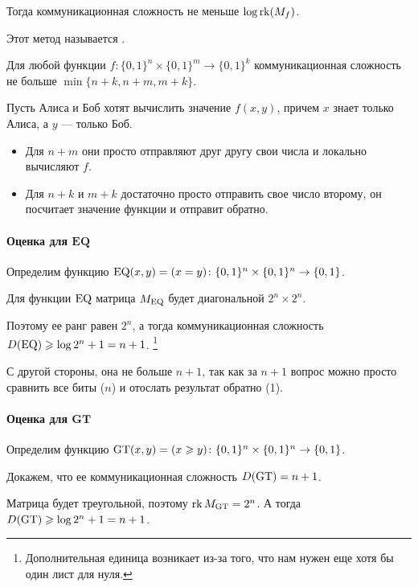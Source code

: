 Тогда коммуникационная сложность не меньше $ \log \operatorname{rk} (M_f)$.

Этот метод называется .

\begin{lm}\label{lm:minsum}
    Для любой функции $ f\colon \{0, 1\}^{n} \times  \{0, 1\}^{m} \to \{0, 1\}^{k}$ коммуникационная сложность не больше $ \min \{n+k, n+m, m+k\}$.
\end{lm}
\begin{proof*}
	Пусть Алиса и Боб хотят вычислить значение $ f(x, y)$, причем  $ x$ знает только Алиса, а $ y$ --- только Боб.
	\begin{itemize}
		\item Для $ n+m$ они просто отправляют друг другу свои числа и локально вычисляют $ f$.
		\item Для $ n+k$ и  $ m+k$ достаточно просто отправить свое число второму, он посчитает значение функции и отправит обратно.
	\end{itemize}

\end{proof*}

\paragraph{Оценка для $ \mathbf{EQ}$}
Определим функцию $ \operatorname{EQ}(x, y) = (x = y) \colon \{0, 1\}^{n} \times \{0, 1\}^{n} \to \{0, 1\}$.

Для функции $\operatorname{EQ}$ матрица $ M_{\operatorname{EQ}}$ будет диагональной $ 2^{n}\times 2^{n}$.

Поэтому ее ранг равен $ 2^{n}$, а тогда коммуникационная сложность
$ D(\operatorname{EQ}) \geqslant \log 2^{n} + 1= n +1$.
\footnote{Дополнительная единица возникает из-за того, что нам нужен еще хотя бы один лист для нуля.}

С другой стороны, она не больше $ n+1$, так как за  $ n+1$ вопрос можно просто сравнить все биты ($ n$) и отослать результат обратно (1).

\paragraph{Оценка для $\mathbf{GT}$}
Определим функцию $ \operatorname{GT}(x, y) = (x \geqslant y)\colon \{0, 1\}^{n} \times \{0, 1\}^{n} \to  \{0, 1\}$.

Докажем, что ее коммуникационная сложность $ D(\operatorname{GT}) = n+1$. 

Матрица будет треугольной, поэтому $ \operatorname{rk} M_{\operatorname{GT}} = 2^{n}$. 
А тогда $ D(\operatorname{GT}) \geqslant \log 2^{n} + 1= n+1$.

